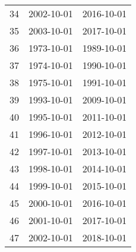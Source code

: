 \begin{tabular}{ccc}
  34 & 2002-10-01 & 2016-10-01 \\ 
  35 & 2003-10-01 & 2017-10-01 \\ 
  36 & 1973-10-01 & 1989-10-01 \\ 
  37 & 1974-10-01 & 1990-10-01 \\ 
  38 & 1975-10-01 & 1991-10-01 \\ 
  39 & 1993-10-01 & 2009-10-01 \\ 
  40 & 1995-10-01 & 2011-10-01 \\ 
  41 & 1996-10-01 & 2012-10-01 \\ 
  42 & 1997-10-01 & 2013-10-01 \\ 
  43 & 1998-10-01 & 2014-10-01 \\ 
  44 & 1999-10-01 & 2015-10-01 \\ 
  45 & 2000-10-01 & 2016-10-01 \\ 
  46 & 2001-10-01 & 2017-10-01 \\ 
  47 & 2002-10-01 & 2018-10-01 \\ 
   \hline
\end{tabular}
